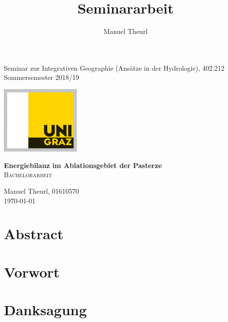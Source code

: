 \documentclass[12pt,a4paper]{article}
\title{Seminararbeit}
\author{Manuel Theurl}
\begin{document}

\begin{titlepage}

\begin{flushright}
\begin{normalsize}
Seminar zur Integrativen Geographie (Ansätze in der Hydrologie), 402.212
\\
Sommersemester 2018/19
\end{normalsize}
\end{flushright}

\vspace{5cm}

\begin{center}
\includegraphics[width=0.3\textwidth]{logo_uni_graz.jpg}

\vspace{1.5cm}

\textbf{\Large Energiebilanz im Ablationsgebiet der Pasterze}\\
\vspace{2cm}
\textsc{\large {Bachelorarbeit}}\\[4cm]
\end{center}

\vspace{2cm}

\begin{flushright}
Manuel Theurl, 01610570\\
\today
\end{flushright}

\end{titlepage} 

\pagebreak
\section*{Abstract}

\pagebreak
\section*{Vorwort}

\pagebreak
\section*{Danksagung}
\end{document}
